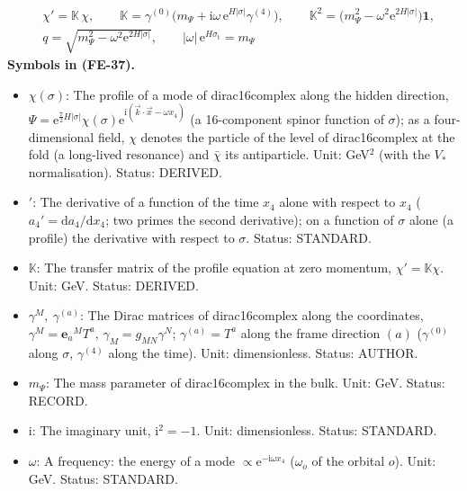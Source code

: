 \documentclass[
  10pt,
]{article}
\providecommand{\tightlist}{%
  \setlength{\itemsep}{0pt}\setlength{\parskip}{0pt}}
\begin{document}
\[
\begin{aligned}
&\chi' = \mathbb{K}\,\chi,\qquad \mathbb{K} = \gamma^{(0)}\big(m_\Psi + \mathrm{i}\omega\,\mathrm{e}^{H\lvert\sigma\rvert}\gamma^{(4)}\big),\qquad
\mathbb{K}^2 = \big(m_\Psi^2 - \omega^2\mathrm{e}^{2H\lvert\sigma\rvert}\big)\mathbf{1},\\
&q = \sqrt{m_\Psi^2 - \omega^2\mathrm{e}^{2H\lvert\sigma\rvert}},\qquad \lvert\omega\rvert\,\mathrm{e}^{H\sigma_{\mathrm{t}}} = m_\Psi
\end{aligned} \tag{FE-37}
\] \textbf{Symbols in (FE-37).}

\begin{itemize}
\tightlist
\item
  \(\chi(\sigma)\): The profile of a mode of dirac16complex along the
  hidden direction,
  \(\Psi = \mathrm{e}^{\frac72H\lvert\sigma\rvert}\chi(\sigma)\mathrm{e}^{\mathrm{i}(\vec k\cdot\vec x - \omega x_4)}\)
  (a 16-component spinor function of \(\sigma\)); as a four-dimensional
  field, \(\chi\) denotes the particle of the level of dirac16complex at
  the fold (a long-lived resonance) and \(\bar\chi\) its antiparticle.
  Unit: GeV\(^{2}\) (with the \(V_*\) normalisation). Status: DERIVED.
\item
  \({}'\): The derivative of a function of the time \(x_4\) alone with
  respect to \(x_4\) (\(a_4' = \mathrm{d}a_4/\mathrm{d}x_4\); two primes
  the second derivative); on a function of \(\sigma\) alone (a profile)
  the derivative with respect to \(\sigma\). Status: STANDARD.
\item
  \(\mathbb{K}\): The transfer matrix of the profile equation at zero
  momentum, \(\chi' = \mathbb{K}\chi\). Unit: GeV. Status: DERIVED.
\item
  \(\gamma^M,\ \gamma^{(a)}\): The Dirac matrices of dirac16complex
  along the coordinates, \(\gamma^M = \mathbf{e}_a{}^MT^a\),
  \(\gamma_M = g_{MN}\gamma^N\); \(\gamma^{(a)} = T^a\) along the frame
  direction \((a)\) (\(\gamma^{(0)}\) along \(\sigma\), \(\gamma^{(4)}\)
  along the time). Unit: dimensionless. Status: AUTHOR.
\item
  \(m_\Psi\): The mass parameter of dirac16complex in the bulk. Unit:
  GeV. Status: RECORD.
\item
  \(\mathrm{i}\): The imaginary unit, \(\mathrm{i}^2 = -1\). Unit:
  dimensionless. Status: STANDARD.
\item
  \(\omega\): A frequency: the energy of a mode
  \(\propto \mathrm{e}^{-\mathrm{i}\omega x_4}\) (\(\omega_o\) of the
  orbital \(o\)). Unit: GeV. Status: STANDARD.

\end{itemize}
\end{document}
